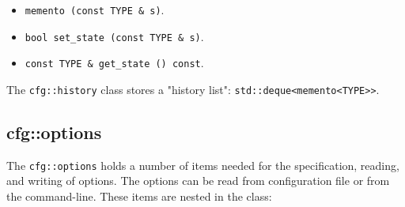    \begin{itemize}
      \item \texttt{memento (const TYPE \& s)}.
      \item \texttt{bool set\_state (const TYPE \& s)}.
      \item \texttt{const TYPE \& get\_state () const}.
   \end{itemize}

   The \texttt{cfg::history} class stores a "history list":
   \texttt{std::deque<memento<TYPE>>}.

\subsection{cfg::options}
\label{subsec:cfg_namespace_options}

   The \texttt{cfg::options} holds a number of items needed for the
   specification, reading, and writing of options.
   The options can be read from configuration file or from the command-line.
   These items are nested in the class:

